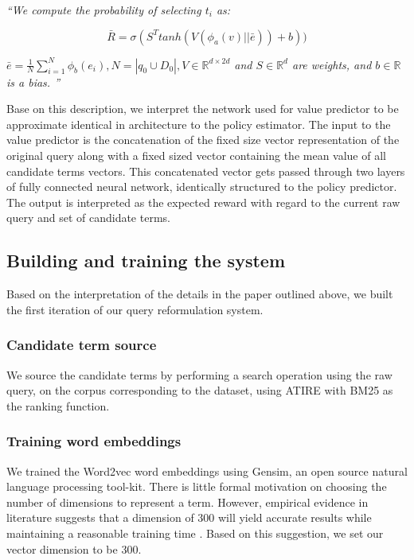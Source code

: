 \textit{``We compute the probability of selecting $t_i$ as:}

\begin{equation}
\bar{R} = \sigma(S^T tanh(V(\phi_a(v)|| \bar{e})) + b))
\end{equation}

\textit{ $\bar{e}=\frac{1}{N} \sum_{i=1}^{N} \phi_b(e_i), N=|q_0 \cup D_0|, V \in \mathbb{R}^{d\times2d}$ and $S \in \mathbb{R}^d$ are weights, and $b \in \mathbb{R}$ is a bias. ''}


Base on this description, we interpret the network used for value predictor to be approximate identical in architecture to the policy estimator. The input to the value predictor is the concatenation of the fixed size vector representation of the original query along with a fixed sized vector containing the mean value of all candidate terms vectors. This concatenated vector gets passed through two layers of fully connected neural network, identically structured to the policy predictor. The output is interpreted as the expected reward with regard to the current raw query and set of candidate terms.







\subsection{Building and training the system}

Based on the interpretation of the details in the paper outlined above, we built the first iteration of our query reformulation system. 

\subsubsection{Candidate term source}
We source the candidate terms by performing a search operation using the raw query, on the corpus corresponding to the dataset, using ATIRE with BM25 as the ranking function. 

\subsubsection{Training word embeddings}

We trained the Word2vec word embeddings using Gensim, an open source natural language processing tool-kit. There is little formal motivation on choosing the number of dimensions to represent a term. However, empirical evidence in literature suggests that a dimension of 300 will yield accurate results while maintaining a reasonable training time \cite{pennington2014glove}. Based on this suggestion, we set our vector dimension to be 300. 


